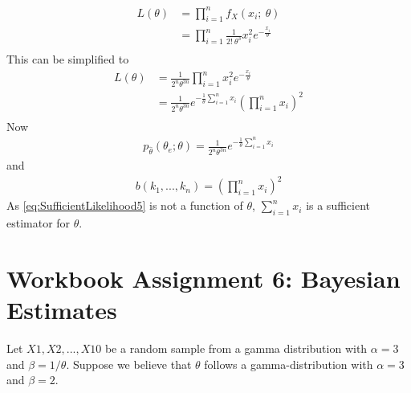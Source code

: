 \begin{equation}
\begin{split}
L(\theta) 
&= \prod_{i=1}^n f_X(x_i;~\theta)\\
&= \prod_{i=1}^n \frac{1}{2!~\theta^3}x_i^2e^{-\frac{x_i}{\theta}}\\
\end{split}
\label{eq:SufficientLikelihood2}
\end{equation}
This can be simplified to 
\begin{equation}
\begin{split}
L(\theta) 
&= \frac{1}{2^n\theta^{3n}}\prod_{i=1}^n x_i^2e^{-\frac{x_i}{\theta}}\\
&= \frac{1}{2^n\theta^{3n}} e^{-\frac{1}{\theta}\sum_{i=1}^nx_i} \left(\prod_{i=1}^n x_i\right)^2\\
\end{split}
\label{eq:SufficientLikelihood3}
\end{equation}
Now
\begin{equation}
\begin{split}
p_{\hat{\theta}}(\theta_e;\theta) = \frac{1}{2^n\theta^{3n}} e^{-\frac{1}{\theta}\sum_{i=1}^nx_i}
\end{split}
\label{eq:SufficientLikelihood4}
\end{equation}
and
\begin{equation}
\begin{split}
b(k_1,...,k_n) = \left(\prod_{i=1}^n x_i\right)^2
\end{split}
\label{eq:SufficientLikelihood5}
\end{equation}
As \eqref{eq:SufficientLikelihood5} is not a function of $\theta$, $\sum_{i=1}^nx_i$ is a sufficient estimator for $\theta$.






\chapter{Workbook Assignment 6: Bayesian Estimates}	
Let $X1, X2, ... , X10$ be a random sample from a gamma distribution with $\alpha =3$ and $\beta =1/\theta$. Suppose we believe that $\theta$ follows a gamma-distribution with $\alpha =3$ and $\beta = 2$.

